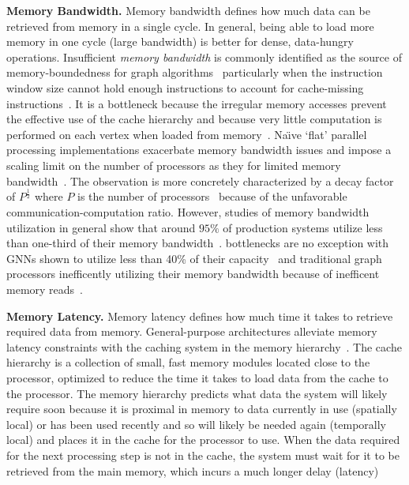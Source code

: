 \textbf{Memory Bandwidth.} 
Memory bandwidth defines how much data can be retrieved from memory in a single cycle. 
In general, being able to load more memory in one cycle (large bandwidth) is better for dense, data-hungry operations.
Insufficient \textit{memory bandwidth} is commonly identified as the source of memory-boundedness for graph algorithms~\cite{Satish2014} particularly when the instruction window size cannot hold enough instructions to account for cache-missing instructions~\cite{Beamer2015}. 
It is a bottleneck because the irregular memory accesses prevent the effective use of the cache hierarchy and because very little computation is performed on each vertex when loaded from memory~\cite{Ahn2015}.
Na\"{\i}ve `flat' parallel processing implementations exacerbate memory bandwidth issues and impose a scaling limit on the number of processors as they for  limited memory bandwidth~\cite{Fu2014}.
The observation is more concretely characterized by a decay factor of $P^{\frac{1}{2}}$ where $P$ is the number of processors~\cite{Buluc2012} because of the unfavorable communication-computation ratio.
However, studies of memory bandwidth utilization in general show that around $95\%$ of production systems utilize less than one-third of their memory bandwidth~\cite{Kanev2015}.
\gai bottlenecks are no exception with GNNs shown to utilize less than 40\% of their capacity~\cite{Wu2021a} and traditional graph processors inefficently utilizing their memory bandwidth because of inefficent memory reads~\cite{Beamer2015, Aananthakrishnan2020, Zhang2017, Song2016}.

\textbf{Memory Latency.} 
Memory latency defines how much time it takes to retrieve required data from memory. 
General-purpose architectures alleviate memory latency constraints with the caching system in the memory hierarchy~\cite{Hennessy2019}.
The cache hierarchy is a collection of small, fast memory modules located close to the processor, optimized to reduce the time it takes to load data from the cache to the processor. 
The memory hierarchy predicts what data the system will likely require soon because it is proximal in memory to data currently in use (spatially local) or has been used recently and so will likely be needed again (temporally local) and places it in the cache for the processor to use.
When the data required for the next processing step is not in the cache, the system must wait for it to be retrieved from the main memory, which incurs a much longer delay (latency) 

